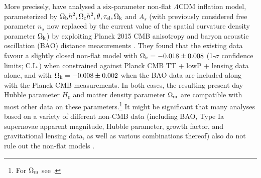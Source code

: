 \documentclass[useAMS,usenatbib]{mnras}
\begin{document}
More precisely, \cite{2017arXiv170703452O} have analysed a six-parameter 
non-flat $\Lambda$CDM inflation model, parameterized by
$\Omega_{\rm b}h^2, \Omega_{\rm c}h^2, \theta, \tau_{\rm el}, \Omega_{\rm k}$ and 
$A_s$ (with previously considered free parameter $n_s$ now replaced by 
the current value of the spatial curvature density parameter $\Omega_{\rm k}$) 
by exploiting Planck 2015 CMB anisotropy \citep{2016A&A...594A..13P} and 
baryon acoustic oscillation (BAO) distance measurements
\citep{2011MNRAS.416.3017B,2014MNRAS.441...24A,2015MNRAS.449..835R}.
They found that the existing data favour a slightly closed non-flat model 
with $\Omega_{\rm k}=-0.018\pm0.008$ (1-$\sigma$ confidence limits; C.L.) when 
constrained against Planck CMB TT + lowP + lensing data alone, and with 
$\Omega_{\rm k}=-0.008\pm0.002$ when the BAO data are included along with the 
Planck CMB measurements. In both cases, the resulting present day Hubble 
parameter $H_0$ and matter density parameter $\Omega_{\rm m}$ are compatible 
with most other data on these parameters.\footnote{For $\Omega_{\rm m}$ 
see \citet{2003PASP..115.1143C}.} It might be significant that many analyses 
based on a variety of different non-CMB data (including BAO, Type Ia 
supernovae apparent magnitude, Hubble parameter, growth factor, and 
gravitational lensing data, as well as various combinations thereof)
also do not rule out the non-flat 
models \citep{2015Ap&SS.357...11F,2014PhRvD..90b3012S,2014ApJ...789L..15L,
2016PhRvD..93d3517C,2016ApJ...829...61C,2016ApJ...828...85Y,2017JCAP...01..015L,
2017ApJ...835...26F,2016ApJ...833..240L,2017ApJ...838..160W,2017JCAP...03..028R,2018ApJ...856....3Y}.
\end{document}
